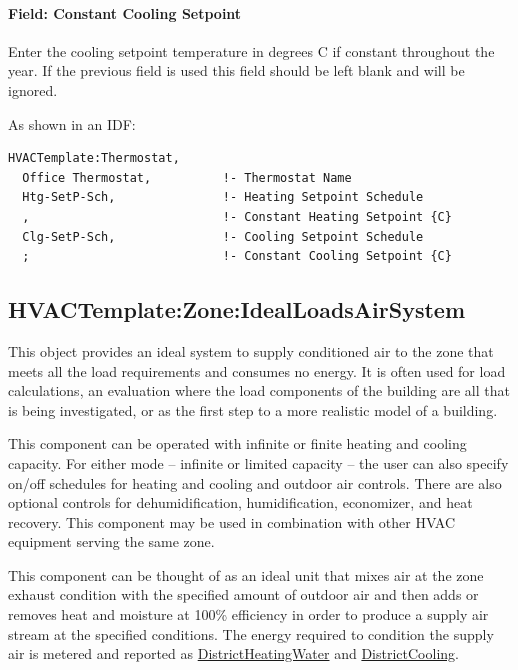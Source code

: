 \paragraph{Field: Constant Cooling Setpoint}\label{field-constant-cooling-setpoint}

Enter the cooling setpoint temperature in degrees C if constant throughout the year. If the previous field is used this field should be left blank and will be ignored.

As shown in an IDF:

\begin{lstlisting}
HVACTemplate:Thermostat,
  Office Thermostat,          !- Thermostat Name
  Htg-SetP-Sch,               !- Heating Setpoint Schedule
  ,                           !- Constant Heating Setpoint {C}
  Clg-SetP-Sch,               !- Cooling Setpoint Schedule
  ;                           !- Constant Cooling Setpoint {C}
\end{lstlisting}

\subsection{HVACTemplate:Zone:IdealLoadsAirSystem}\label{hvactemplatezoneidealloadsairsystem}

This object provides an ideal system to supply conditioned air to the zone that meets all the load requirements and consumes no energy. It is often used for load calculations, an evaluation where the load components of the building are all that is being investigated, or as the first step to a more realistic model of a building.

This component can be operated with infinite or finite heating and cooling capacity. For either mode -- infinite or limited capacity -- the user can also specify on/off schedules for heating and cooling and outdoor air controls. There are also optional controls for dehumidification, humidification, economizer, and heat recovery. This component may be used in combination with other HVAC equipment serving the same zone.

This component can be thought of as an ideal unit that mixes air at the zone exhaust condition with the specified amount of outdoor air and then adds or removes heat and moisture at 100\% efficiency in order to produce a supply air stream at the specified conditions. The energy required to condition the supply air is metered and reported as \hyperref[districtheating]{DistrictHeatingWater} and \hyperref[districtcooling]{DistrictCooling}.

